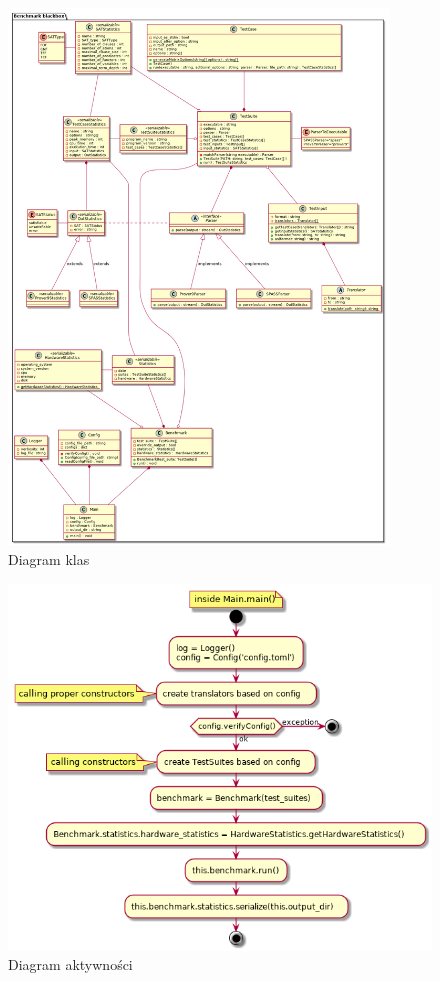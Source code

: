 \documentclass[a4paper,12pt]{article}
\begin{document}
\begin{figure}[H]
  \centering
  \includegraphics[width=0.9\textwidth]{benchmark/class_diagram.png}
  \caption{Diagram klas}
\end{figure}

\begin{figure}[H]
  \centering
  \includegraphics[width=\textwidth]{benchmark/activity_diagrams/main_run.png}
  \caption{Diagram aktywności}
\end{figure}
\end{document}
